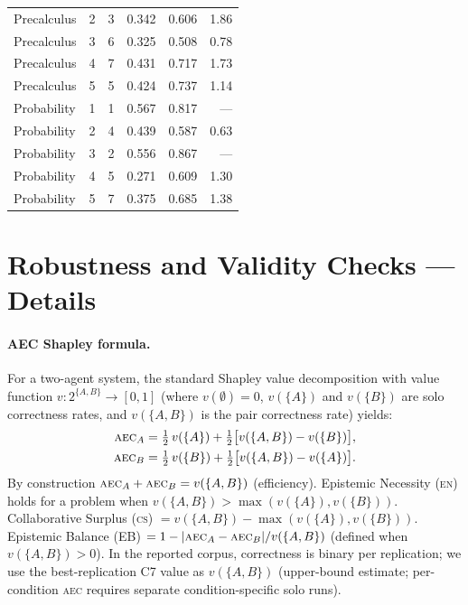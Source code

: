 \documentclass{article}
\newcommand{\AEC}{\textsc{aec}}
\newcommand{\EN}{\textsc{en}}
\newcommand{\CS}{\textsc{cs}}
\begin{document}
\begin{table}[h]
\begin{tabular}{llrrrr}
    Precalculus     & 2 &  3 & 0.342 & 0.606 & 1.86 \\
    Precalculus     & 3 &  6 & 0.325 & 0.508 & 0.78 \\
    Precalculus     & 4 &  7 & 0.431 & 0.717 & 1.73 \\
    Precalculus     & 5 &  5 & 0.424 & 0.737 & 1.14 \\
    \midrule
    Probability     & 1 &  1 & 0.567 & 0.817 & --- \\
    Probability     & 2 &  4 & 0.439 & 0.587 & 0.63 \\
    Probability     & 3 &  2 & 0.556 & 0.867 & --- \\
    Probability     & 4 &  5 & 0.271 & 0.609 & 1.30 \\
    Probability     & 5 &  7 & 0.375 & 0.685 & 1.38 \\
    \bottomrule
  \end{tabular}
\end{table}

\section{Robustness and Validity Checks — Details}
\label{app:robustness}

\paragraph{AEC Shapley formula.}
For a two-agent system, the standard Shapley value decomposition with
value function $v : 2^{\{A,B\}} \to [0,1]$ (where $v(\emptyset)=0$,
$v(\{A\})$ and $v(\{B\})$ are solo correctness rates, and
$v(\{A,B\})$ is the pair correctness rate) yields:
\begin{align}
  \AEC_A &= \tfrac{1}{2}\,v(\{A\}) + \tfrac{1}{2}\bigl[v(\{A,B\}) - v(\{B\})\bigr], \\
  \AEC_B &= \tfrac{1}{2}\,v(\{B\}) + \tfrac{1}{2}\bigl[v(\{A,B\}) - v(\{A\})\bigr].
\end{align}
By construction $\AEC_A + \AEC_B = v(\{A,B\})$ (efficiency).
Epistemic Necessity (\EN) holds for a problem when $v(\{A,B\}) > \max(v(\{A\}), v(\{B\}))$.
Collaborative Surplus (\CS) $= v(\{A,B\}) - \max(v(\{A\}), v(\{B\}))$.
Epistemic Balance (EB) $= 1 - |{\AEC_A - \AEC_B}| / v(\{A,B\})$ (defined when $v(\{A,B\}) > 0$).
In the reported corpus, correctness is binary per replication; we use
the best-replication C7 value as $v(\{A,B\})$ (upper-bound estimate;
per-condition \AEC{} requires separate condition-specific solo runs).
\end{document}
